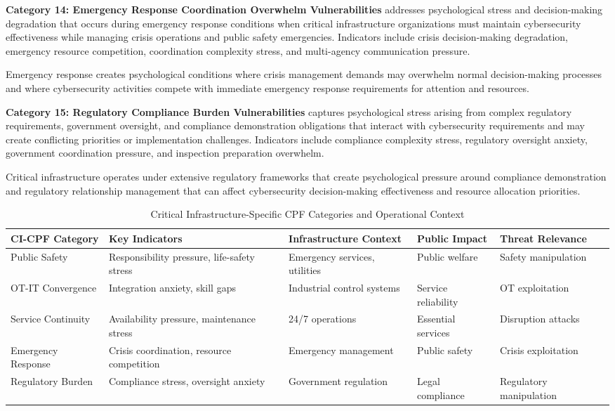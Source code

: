 \documentclass[10pt, twocolumn]{article}
\begin{document}
\textbf{Category 14: Emergency Response Coordination Overwhelm Vulnerabilities} addresses psychological stress and decision-making degradation that occurs during emergency response conditions when critical infrastructure organizations must maintain cybersecurity effectiveness while managing crisis operations and public safety emergencies. Indicators include crisis decision-making degradation, emergency resource competition, coordination complexity stress, and multi-agency communication pressure.

Emergency response creates psychological conditions where crisis management demands may overwhelm normal decision-making processes and where cybersecurity activities compete with immediate emergency response requirements for attention and resources.

\textbf{Category 15: Regulatory Compliance Burden Vulnerabilities} captures psychological stress arising from complex regulatory requirements, government oversight, and compliance demonstration obligations that interact with cybersecurity requirements and may create conflicting priorities or implementation challenges. Indicators include compliance complexity stress, regulatory oversight anxiety, government coordination pressure, and inspection preparation overwhelm.

Critical infrastructure operates under extensive regulatory frameworks that create psychological pressure around compliance demonstration and regulatory relationship management that can affect cybersecurity decision-making effectiveness and resource allocation priorities.

\begin{table*}[t]
\caption{Critical Infrastructure-Specific CPF Categories and Operational Context}
\label{tab:infrastructure_cpf_categories}
\centering
\small
\begin{tabular}{@{}p{3.0cm} p{2.8cm} p{2.6cm} p{2.8cm} p{2.8cm}@{}}
\toprule
\textbf{CI-CPF Category} & \textbf{Key Indicators} & \textbf{Infrastructure Context} & \textbf{Public Impact} & \textbf{Threat Relevance} \\
\midrule
Public Safety & Responsibility pressure, life-safety stress & Emergency services, utilities & Public welfare & Safety manipulation \\
\midrule
OT-IT Convergence & Integration anxiety, skill gaps & Industrial control systems & Service reliability & OT exploitation \\
\midrule
Service Continuity & Availability pressure, maintenance stress & 24/7 operations & Essential services & Disruption attacks \\
\midrule
Emergency Response & Crisis coordination, resource competition & Emergency management & Public safety & Crisis exploitation \\
\midrule
Regulatory Burden & Compliance stress, oversight anxiety & Government regulation & Legal compliance & Regulatory manipulation \\
\bottomrule
\end{tabular}
\end{table*}
\end{document}
